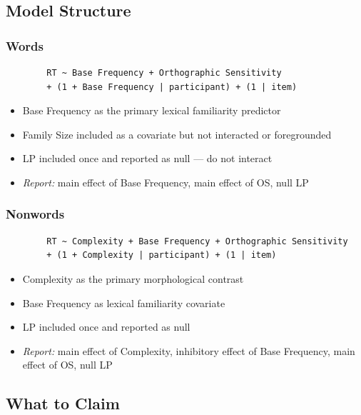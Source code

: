 \documentclass[12pt]{article}
\begin{document}
	\subsection{Model Structure}
	
	\subsubsection{Words}
	
	\begin{verbatim}
		RT ~ Base Frequency + Orthographic Sensitivity
		+ (1 + Base Frequency | participant) + (1 | item)
	\end{verbatim}
	
	\begin{itemize}
		\item Base Frequency as the primary lexical familiarity predictor
		\item Family Size included as a covariate but not interacted or foregrounded
		\item LP included once and reported as null --- do not interact
		\item \textit{Report:} main effect of Base Frequency, main effect of OS, null LP
	\end{itemize}
	
	\subsubsection{Nonwords}
	
	\begin{verbatim}
		RT ~ Complexity + Base Frequency + Orthographic Sensitivity
		+ (1 + Complexity | participant) + (1 | item)
	\end{verbatim}
	
	\begin{itemize}
		\item Complexity as the primary morphological contrast
		\item Base Frequency as lexical familiarity covariate
		\item LP included once and reported as null
		\item \textit{Report:} main effect of Complexity, inhibitory effect of Base Frequency, main effect of OS, null LP
	\end{itemize}
	
	\subsection{What to Claim}
	
\end{document}
